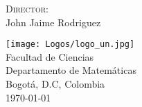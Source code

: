 \documentclass[12pt]{book}
\begin{document}
\renewcommand{\contentsname}{\vspace{0cm} Contenido \vspace{-2cm}}
\begin{titlepage}
\vspace*{2cm}
\noindent
{}

\vspace*{2cm}
\begin{minipage}{\linewidth}

\centering \scshape \printauthor
\vspace*{2cm}

\textsc{Director:}\\
\vspace{0.1cm}
John Jaime Rodriguez\\
\vspace{2.5cm}

\texttt{[image: Logos/logo\_un.jpg]}\\
\fontsize{13pt}{13pt}\selectfont   Facultad de Ciencias\\
\vspace{0.1cm}
Departamento de Matemáticas\\
\vspace{0.1cm}
Bogotá, D.C, Colombia\\
\vspace{0.1cm}
\today
\end{minipage}
\end{titlepage}


\newpage



\blankpages

\blankpages


\let\cleardoublepage=\clearpage
\tableofcontents
\thispagestyle{empty}
\blankpages
\geomdoc %
\end{document}

